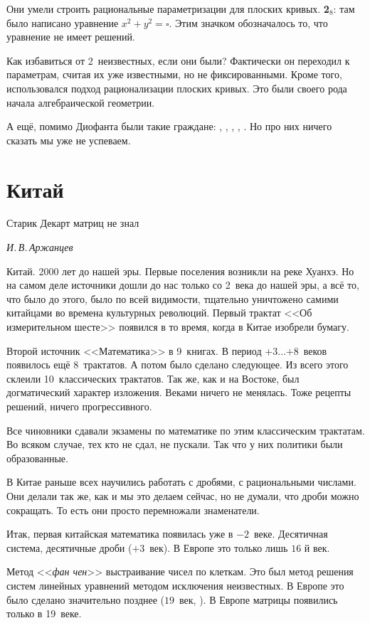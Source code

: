 \documentclass[a4paper,oneside,fleqn,10pt]{article}
\newcommand{\pe}[2]{${#1}\ldots{#2}$}
\begin{document}
Они умели строить рациональные параметризации для плоских кривых.
\textbf{2}$_8$: там было написано уравнение $x^2 + y^2 = \square$.
Этим значком обозначалось то, что уравнение не имеет решений.

Как избавиться от 2~неизвестных, если они были? Фактически он переходил к параметрам,
считая их уже известными, но не фиксированными. Кроме того, использовался подход
рационализации плоских кривых. Это были своего рода начала алгебраической геометрии.

А ещё, помимо Диофанта были такие граждане:
, , , , .
Но про них ничего сказать мы уже не успеваем.


\section{Китай}

\epigraph{Старик Декарт матриц не знал}{\emph{И.\,В.\,Аржанцев}}

Китай. 2000 лет до нашей эры. Первые поселения возникли на реке Хуанхэ.
Но на самом деле источники дошли до нас только со 2~века до нашей эры,
а всё то, что было до этого, было по всей видимости, тщательно уничтожено
самими китайцами во времена культурных революций.
Первый трактат <<Об измерительном шесте>>
появился в то время, когда в Китае изобрели бумагу.

Второй источник <<Математика>> в 9~книгах. В период \pe{+3}{+8}~веков появилось ещё 8~трактатов.
А потом было сделано следующее. Из всего этого склеили 10~классических трактатов.
Так же, как и на Востоке, был догматический характер изложения.
Веками ничего не менялась. Тоже рецепты решений, ничего прогрессивного.

Все чиновники сдавали экзамены по математике по этим классическим трактатам.
Во всяком случае, тех кто не сдал, не пускали. Так что у них политики были образованные.

В Китае раньше всех научились работать с дробями, с рациональными числами.
Они делали так же, как и мы это делаем сейчас, но не думали, что дроби можно сокращать.
То есть они просто перемножали знаменатели.

Итак, первая китайская математика появилась уже в $-2$~веке.
Десятичная система, десятичные дроби ($+3$~век).
В Европе это только лишь $16$ й век.

Метод <<\emph{фан чен}>> выстраивание чисел по клеткам.
Это был метод решения систем линейных уравнений методом исключения
неизвестных. В Европе это было сделано значительно позднее ($19$~век, ).
В Европе матрицы появились только в 19~веке.
\end{document}
